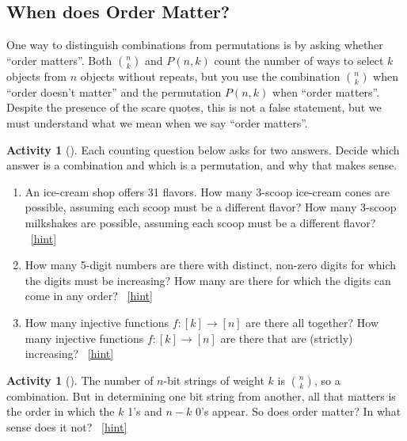 \documentclass[10pt,]{book}
\theoremstyle{plain}
\theoremstyle{definition}
\theoremstyle{definition}
\theoremstyle{definition}
\newtheorem{activity}[project]{Activity}
\numberwithin{equation}{chapter}
\begin{document}
\subsection[{When does Order Matter?}]{When does Order Matter?}\label{subsec-ordermatters}
\hypertarget{p-791}{}%
One way to distinguish combinations from permutations is by asking whether ``order matters''.  Both \(\binom{n}{k}\) and \(P(n,k)\) count the number of ways to select \(k\) objects from \(n\) objects without repeats, but you use the combination \(\binom{n}{k}\) when ``order doesn't matter'' and the permutation \(P(n,k)\) when ``order matters''.  Despite the presence of the scare quotes, this is not a false statement, but we must understand what we mean when we say ``order matters''.%
\begin{activity}[]\label{activity-109}
\hypertarget{p-792}{}%
Each counting question below asks for two answers.  Decide which answer is a combination and which is a permutation, and why that makes sense.%
\begin{enumerate}[font=\bfseries,label=(\alph*),ref=\alph*]
\item\label{task-149} \hypertarget{p-793}{}%
An ice-cream shop offers 31 flavors.  How many 3-scoop ice-cream cones are possible, assuming each scoop must be a different flavor?  How many 3-scoop milkshakes are possible, assuming each scoop must be a different flavor?%
~\hfill{\tiny\hyperlink{a-116.a}{[hint]}\hypertarget{q-116.a}{}}\item\label{task-150} \hypertarget{p-795}{}%
How many 5-digit numbers are there with distinct, non-zero digits for which the digits must be increasing?  How many are there for which the digits can come in any order?%
~\hfill{\tiny\hyperlink{a-116.b}{[hint]}\hypertarget{q-116.b}{}}\item\label{task-151} \hypertarget{p-797}{}%
How many injective functions \(f:[k] \to [n]\) are there all   together?  How many injective functions \(f:[k] \to [n]\) are there that are (strictly) increasing?%
~\hfill{\tiny\hyperlink{a-116.c}{[hint]}\hypertarget{q-116.c}{}}\end{enumerate}
\end{activity}
\begin{activity}[]\label{activity-110}
\hypertarget{p-799}{}%
The number of \(n\)-bit strings of weight \(k\) is \(\binom{n}{k}\), so a combination.  But in determining one bit string from another, all that matters is the order in which the \(k\) 1's and \(n-k\) 0's appear.  So does order matter?  In what sense does it not?%
~\hfill{\tiny\hyperlink{a-117}{[hint]}\hypertarget{q-117}{}}\end{activity}
\end{document}
